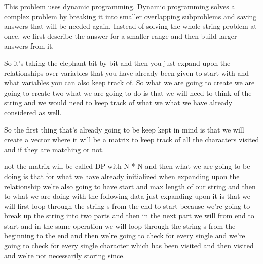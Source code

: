 \expandafter\def\csname sourceexcerpt@29\endcsname{%
This problem uses dynamic programming. Dynamic programming solves a complex problem
by breaking it into smaller overlapping subproblems and saving answers that will be
needed again. Instead of solving the whole string problem at once, we first describe
the answer for a smaller range and then build larger answers from it.

So it's taking the elephant bit by bit and then you just expand upon the relationships
over variables that you have already been given to start with and what variables you
can also keep track of. So what we are going to create we are going to create two what
we are going to do is that we will need to think of the string and we would need to
keep track of what we what we have already considered as well.

So the first thing that's already going to be keep kept in mind is that we will create
a vector where it will be a matrix to keep track of all the characters visited and if
they are matching or not.

not the matrix will be called DP with N * N and then what we are going to be doing is
that for what we have already initialized when expanding upon the relationship we're
also going to have start and max length of our string and then to what we are doing
with the following data just expanding upon it is that we will first loop through the
string s from the end to start because we're going to break up the string into two
parts and then in the next part we will from end to start and in the same operation we
will loop through the string s from the beginning to the end and then we're going to
check for every single and we're going to check for every single character which has
been visited and then visited and we're not necessarily storing since.
}


